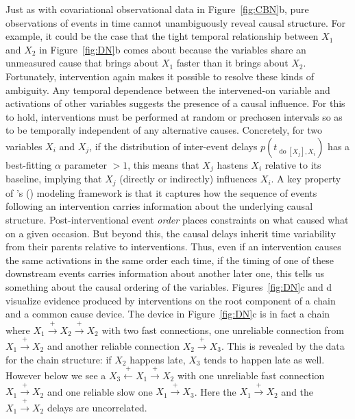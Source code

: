 \documentclass{cambridge7A}%
\def\citeapos#1{\citeauthor{#1}'s (\citeyear{#1})}
\DeclareMathOperator*{\Do}{do}
\begin{document}
Just as with covariational observational data in Figure~\ref{fig:CBN}b, pure observations of events in time cannot unambiguously reveal causal structure.  For example, it could be the case that the tight temporal relationship between $X_1$ and $X_2$ in Figure~\ref{fig:DN}b comes about because the variables share an unmeasured cause that brings about $X_1$ faster than it brings about $X_2$.  Fortunately, intervention again makes it possible to resolve these kinds of ambiguity.  Any temporal dependence between the intervened-on variable and activations of other variables suggests the presence of a causal influence.  For this to hold, interventions must be performed at random or prechosen intervals so as to be temporally independent of any alternative causes.  Concretely, for two variables $X_i$ and $X_j$, if the distribution of inter-event delays $p(t_{\Do[X_j], X_i})$ has a best-fitting $\alpha$ parameter $>1$, this means that $X_j$ hastens $X_i$ relative to its baseline, implying that $X_j$ (directly or indirectly) influences $X_i$.  
A key property of \citeapos{bramley2018time} modeling framework is that it captures how the sequence of events following an intervention carries information about the underlying causal structure. Post-interventional event \emph{order} places constraints on what caused what on a given occasion.  But beyond this, the causal delays inherit time variability from their parents relative to interventions.  Thus, even if an intervention causes the same activations in the same order each time, if the timing of one of these downstream events carries information about another later one, this tells us something about the causal ordering of the variables.  Figures~\ref{fig:DN}c and d visualize evidence produced by interventions on the root component of a chain and a common cause device.   The device in Figure~\ref{fig:DN}c is in fact a chain where $X_1\!\stackrel{+}\rightarrow\!X_2\!\stackrel{+}\rightarrow\!X_2$ with two fast connections, one unreliable connection from $X_1\!\stackrel{+}\rightarrow\!X_2$ and another reliable connection $X_2\!\stackrel{+}\rightarrow\!X_3$.  This is revealed by the data for the chain structure: if $X_2$ happens late, $X_3$ tends to happen late as well.  However below we see a $X_3\!\stackrel{+}\leftarrow\!X_1\!\stackrel{+}\rightarrow\!X_2$ with one unreliable fast connection $X_1\!\stackrel{+}\rightarrow\!X_2$ and one reliable slow one $X_1\!\stackrel{+}\rightarrow\!X_3$.  Here the $X_1\!\stackrel{+}\rightarrow\!X_2$ and the $X_1\!\stackrel{+}\rightarrow\!X_2$ delays are uncorrelated.  
\end{document}
